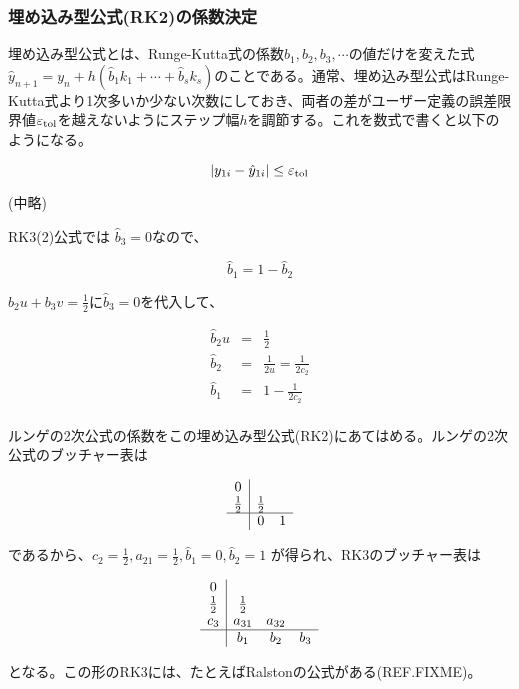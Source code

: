 \subsubsection{埋め込み型公式(RK2)の係数決定}
埋め込み型公式とは、Runge-Kutta式の係数\(b_1, b_2 , b_3 , \cdots \)の値だけを変えた式\(\hat{y}_{n+1} = y_n + h (\hat{b}_1 k_1 + \cdots + \hat{b}_s k_s)\)のことである。通常、埋め込み型公式はRunge-Kutta式より1次多いか少ない次数にしておき、両者の差がユーザー定義の誤差限界値\(\varepsilon_{\rm tol}\)を越えないようにステップ幅\(h\)を調節する。これを数式で書くと以下のようになる。

\[|y_{1i} - \hat{y}_{1i}| \leq \varepsilon_{\rm tol}\]

(中略)

RK3(2)公式では \(\hat{b}_3 = 0\)なので、

\[\hat{b}_1 = 1 - \hat{b}_2\]

\(b_2u + b_3v = \frac{1}{2}\)に\(\hat{b}_3 = 0\)を代入して、

\[
\begin{array}{lcl}
\hat{b}_2 u & = & \frac{1}{2}\\
\hat{b}_2   & = & \frac{1}{2u} = \frac{1}{2c_2}\\
\hat{b}_1   & = & 1 - \frac{1}{2c_2}\\
\end{array}
\]

ルンゲの2次公式の係数をこの埋め込み型公式(RK2)にあてはめる。ルンゲの2次公式のブッチャー表は

\[
\begin{array}{c|cc}
0           &             & \\
\frac{1}{2} & \frac{1}{2} & \\
\hline
            & 0           & 1\\
\end{array}
\] 

であるから、\(c_2 = \frac{1}{2}, a_{21}=\frac{1}{2}, \hat{b}_1 = 0, \hat{b}_2 = 1\) が得られ、RK3のブッチャー表は

\[
\begin{array}{c|ccc}
0           &             &        & \\
\frac{1}{2} & \frac{1}{2} &        & \\
c_3         & a_{31}       & a_{32} & \\
\hline
            & b_1         & b_2    & b_3\\
\end{array}
\] 

となる。この形のRK3には、たとえばRalstonの公式がある(REF.FIXME)。


